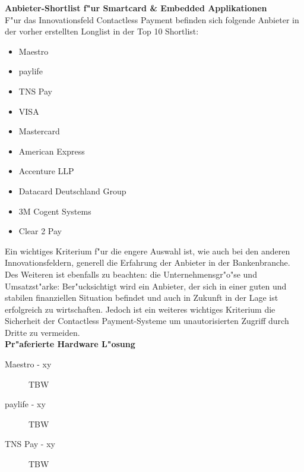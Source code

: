 \textbf{Anbieter-Shortlist f"ur Smartcard \& Embedded Applikationen}\\
F"ur das Innovationsfeld Contactless Payment befinden sich folgende Anbieter in der vorher erstellten Longlist in der Top 10 Shortlist:

\begin{itemize}
	\item Maestro
	\item paylife
	\item TNS Pay
	\item VISA
	\item Mastercard
	\item American Express
	\item Accenture LLP
	\item Datacard Deutschland Group
	\item 3M Cogent Systems
	\item Clear 2 Pay
\end{itemize}

Ein wichtiges Kriterium f"ur die engere Auswahl ist, wie auch bei den anderen Innovationsfeldern, generell die Erfahrung der Anbieter in der Bankenbranche. Des Weiteren ist ebenfalls zu beachten: die Unternehmensgr"o"se und Umsatzst"arke: Ber"ucksichtigt wird ein Anbieter, der sich in einer guten und stabilen finanziellen Situation befindet und auch in Zukunft in der Lage ist erfolgreich zu wirtschaften. Jedoch ist ein weiteres wichtiges Kriterium die Sicherheit der Contactless Payment-Systeme um unautorisierten Zugriff durch Dritte zu vermeiden. \\

\textbf{Pr"aferierte Hardware L"osung}

\begin{description}
	
	\item[Maestro - xy] TBW
	
	\item[paylife - xy] TBW

	\item[TNS Pay - xy] TBW

\end{description}